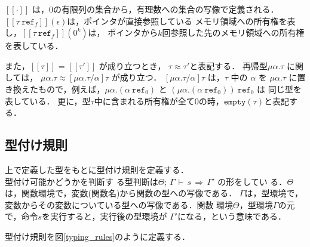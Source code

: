 $[\![\cdot]\!]$ は，$0$の有限列の集合から，有理数への集合の写像で定義される．
$[\![\tau\ \texttt{ref}_{f}]\!](\epsilon)$は，ポインタが直接参照している
メモリ領域への所有権を表し，$[\![\tau\ \texttt{ref}_{f}]\!](0^k)$は，
ポインタから$k$回参照した先のメモリ領域への所有権を表している．

また，$[\![\tau]\!]$ = $[\![\tau']\!]$ が成り立つとき，
$\tau \approx \tau'$と表記する．
再帰型$\mu \alpha . \tau$ に関しては，
$\mu \alpha . \tau \approx [\mu \alpha. \tau / \alpha] \tau$ が成り立つ．
$[\mu \alpha. \tau / \alpha] \tau$ は，$\tau$ 中の $\alpha$ を $\mu \alpha. \tau$
に置き換えたもので，例えば，$\mu \alpha. (\alpha\ \texttt{ref}_{0})$ と
$(\mu \alpha. (\alpha\ \texttt{ref}_{0}))\ \texttt{ref}_{0} $ は
同じ型を表している．
更に，型$\tau$中に含まれる所有権が全て$0$の時，$\texttt{empty}(\tau)$と表記する．


\subsection{型付け規則}
上で定義した型をもとに型付け規則を定義する．\\型付け可能かどうかを判断す
る型判断は$\Theta;\,\Gamma\,\vdash\,s\,\Rightarrow\,\Gamma'$ の形をしてい
る．$\Theta$は，関数環境で，変数(関数名)から関数の型への写像である．
$\Gamma$は，型環境で，変数からその変数についている型への写像である．関数
環境$\Theta$，型環境$\Gamma$の元で，命令$s$を実行すると，実行後の型環境が
$\Gamma'$になる，という意味である．
\begin{definition}[型付け規則]
型付け規則を図\ref{typing_rules}のように定義する．
\end{definition}

